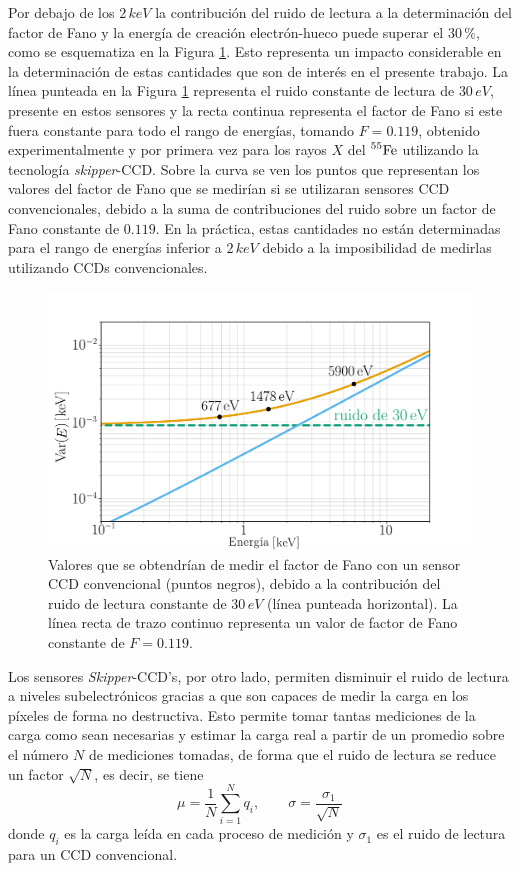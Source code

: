 Por debajo de los $2\,\si{keV}$ la contribución del ruido de lectura a la determinación del factor de Fano y la energía de creación electrón-hueco puede superar el $30\,\%$, como se esquematiza en la Figura \ref{fig:Fano_y_ruido}. Esto representa un impacto considerable en la determinación de estas cantidades que son de interés en el presente trabajo. La línea punteada en la Figura \ref{fig:Fano_y_ruido} representa el ruido constante de lectura de $30\,\si{eV}$, presente en estos sensores y la recta continua representa el factor de Fano si este fuera constante para todo el rango de energías, tomando $F=0.119$, obtenido experimentalmente y por primera vez para los rayos $X$ del $\prescript{55}{}{\mbox{Fe}}$ utilizando la tecnología \textit{skipper}-CCD\cite{Rodrigues}. 
Sobre la curva se ven los puntos que representan los valores del factor de Fano que se medirían si se utilizaran sensores CCD convencionales, debido a la suma de contribuciones del ruido sobre un factor de Fano constante de $0.119$. En la práctica, estas cantidades no están determinadas para el rango de energías inferior a $2\,\si{keV}$ debido a la imposibilidad de medirlas utilizando CCDs convencionales.
\begin{figure}[h]
    \centering
        \includegraphics[scale=0.5]{Figs/fano_y_ruido.pdf}
    \caption{Valores que se obtendrían de medir el factor de Fano con un sensor CCD convencional (puntos negros), debido a la contribución del ruido de lectura constante de $30\,\si{eV}$ (línea punteada horizontal). La línea recta de trazo continuo representa un valor de factor de Fano constante de $F = 0.119$.}
    \label{fig:Fano_y_ruido}
\end{figure}

Los sensores \textit{Skipper}-CCD's, por otro lado, permiten disminuir el ruido de lectura a niveles subelectrónicos gracias a que son capaces de medir la carga en los píxeles de forma no destructiva. Esto permite tomar tantas mediciones de la carga como sean necesarias y estimar la carga real a partir de un promedio sobre el número $N$ de mediciones tomadas, de forma que el ruido de lectura se reduce un factor $\sqrt{N}$\cite{Tiffenberg}, es decir, se tiene
\begin{equation*}
    \mu = \frac{1}{N}\sum\limits_{i = 1}^{N} q_{i},
    \quad\quad
    \sigma = \frac{\sigma_{1}}{\sqrt{N}}
\end{equation*}
donde $q_{i}$ es la carga leída en cada proceso de medición y $\sigma_{1}$ es el ruido de lectura para un CCD convencional. 

